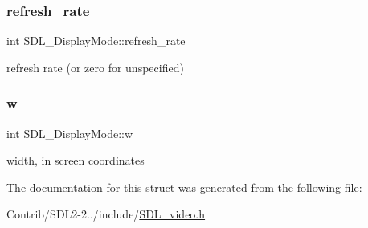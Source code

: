 \subsubsection{\texorpdfstring{refresh\+\_\+rate}{refresh\_rate}}
{\footnotesize\ttfamily int S\+D\+L\+\_\+\+Display\+Mode\+::refresh\+\_\+rate}

refresh rate (or zero for unspecified) \mbox{\label{struct_s_d_l___display_mode_a504bb5e21950b719a0df43be51199046}} 
\subsubsection{\texorpdfstring{w}{w}}
{\footnotesize\ttfamily int S\+D\+L\+\_\+\+Display\+Mode\+::w}

width, in screen coordinates 

The documentation for this struct was generated from the following file\+:\begin{DoxyCompactItemize}
\item 
Contrib/\+S\+D\+L2-\/2../include/\mbox{\hyperlink{_s_d_l__video_8h}{S\+D\+L\+\_\+video.\+h}}\end{DoxyCompactItemize}
